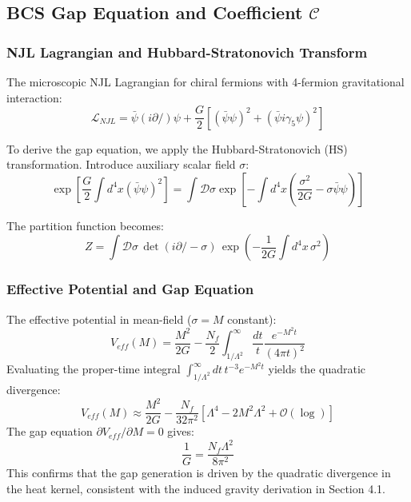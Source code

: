 \documentclass[a4paper,12pt]{article}
\newcommand{\slashed}[1]{\ensuremath{#1\!\!\!/}}
\begin{document}
\subsection{BCS Gap Equation and Coefficient $\mathcal{C}$}

\subsubsection{NJL Lagrangian and Hubbard-Stratonovich Transform}
The microscopic NJL Lagrangian for chiral fermions with 4-fermion gravitational interaction:
\begin{equation}
\mathcal{L}_{NJL} = \bar{\psi}(i\slashed{\partial})\psi + \frac{G}{2}[(\bar{\psi}\psi)^2 + (\bar{\psi}i\gamma_5\psi)^2]
\end{equation}

To derive the gap equation, we apply the Hubbard-Stratonovich (HS) transformation. Introduce auxiliary scalar field $\sigma$:
\begin{equation}
\exp\left[\frac{G}{2}\int d^4x (\bar{\psi}\psi)^2\right] = \int \mathcal{D}\sigma \exp\left[-\int d^4x \left(\frac{\sigma^2}{2G} - \sigma\bar{\psi}\psi\right)\right]
\end{equation}

The partition function becomes:
\begin{equation}
Z = \int \mathcal{D}\sigma \, \det(i\slashed{\partial} - \sigma) \, \exp\left(-\frac{1}{2G}\int d^4x\, \sigma^2\right)
\end{equation}

\subsubsection{Effective Potential and Gap Equation}
The effective potential in mean-field ($\sigma = M$ constant):
\begin{equation}
V_{eff}(M) = \frac{M^2}{2G} - \frac{N_f}{2} \int_{1/\Lambda^2}^\infty \frac{dt}{t} \frac{e^{-M^2 t}}{(4\pi t)^2}
\end{equation}
Evaluating the proper-time integral $\int_{1/\Lambda^2}^\infty dt \, t^{-3} e^{-M^2 t}$ yields the quadratic divergence:
\begin{equation}
V_{eff}(M) \approx \frac{M^2}{2G} - \frac{N_f}{32\pi^2}\left[ \Lambda^4 - 2M^2\Lambda^2 + \mathcal{O}(\log) \right]
\end{equation}
The gap equation $\partial V_{eff}/\partial M = 0$ gives:
\begin{equation}
\frac{1}{G} = \frac{N_f \Lambda^2}{8\pi^2}
\end{equation}
This confirms that the gap generation is driven by the quadratic divergence in the heat kernel, consistent with the induced gravity derivation in Section 4.1.
\end{document}
